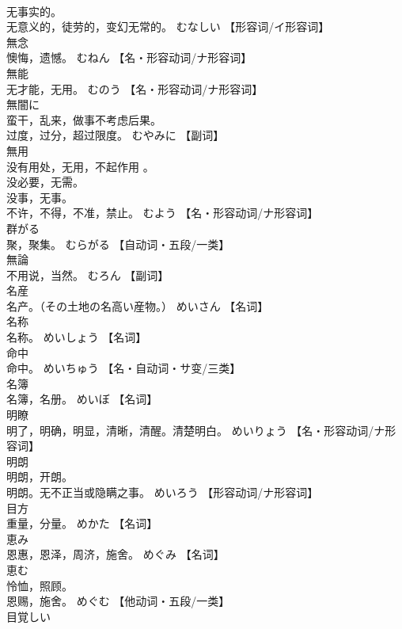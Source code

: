 \documentclass[8pt]{extreport}
\begin{document}
\begin{CJK}{UTF8}{min}
\\	无事实的。 
\\	无意义的，徒劳的，变幻无常的。	むなしい		【形容词/イ形容词】
\\	無念	
\\	懊悔，遗憾。	むねん		【名・形容动词/ナ形容词】
\\	無能	
\\	无才能，无用。	むのう		【名・形容动词/ナ形容词】
\\	無闇に	
\\	蛮干，乱来，做事不考虑后果。 
\\	过度，过分，超过限度。	むやみに		【副词】
\\	無用	
\\	没有用处，无用，不起作用 。 
\\	没必要，无需。 
\\	没事，无事。 
\\	不许，不得，不准，禁止。	むよう		【名・形容动词/ナ形容词】
\\	群がる	
\\	聚，聚集。	むらがる		【自动词・五段/一类】
\\	無論	
\\	不用说，当然。	むろん		【副词】
\\	名産	
\\	名产。（その土地の名高い産物。）	めいさん		【名词】
\\	名称	
\\	名称。	めいしょう		【名词】
\\	命中	
\\	命中。	めいちゅう		【名・自动词・サ变/三类】
\\	名簿	
\\	名簿，名册。	めいぼ		【名词】
\\	明瞭	
\\	明了，明确，明显，清晰，清醒。清楚明白。	めいりょう		【名・形容动词/ナ形容词】
\\	明朗	
\\	明朗，开朗。 
\\	明朗。无不正当或隐瞒之事。	めいろう		【形容动词/ナ形容词】
\\	目方	
\\	重量，分量。	めかた		【名词】
\\	恵み	
\\	恩惠，恩泽，周济，施舍。	めぐみ		【名词】
\\	恵む	
\\	怜恤，照顾。 
\\	恩赐，施舍。	めぐむ		【他动词・五段/一类】
\\	目覚しい	

\end{CJK}
\end{document}

